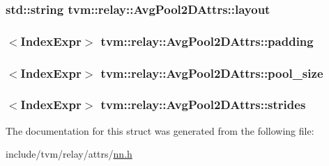 \subsubsection[{\texorpdfstring{layout}{layout}}]{\setlength{\rightskip}{0pt plus 5cm}std\+::string tvm\+::relay\+::\+Avg\+Pool2\+D\+Attrs\+::layout}\hypertarget{structtvm_1_1relay_1_1AvgPool2DAttrs_a73ebaf9cb43a74758479e341050f5ab7}{}\label{structtvm_1_1relay_1_1AvgPool2DAttrs_a73ebaf9cb43a74758479e341050f5ab7}
\subsubsection[{\texorpdfstring{padding}{padding}}]{$<${\bf Index\+Expr}$>$ tvm\+::relay\+::\+Avg\+Pool2\+D\+Attrs\+::padding}\hypertarget{structtvm_1_1relay_1_1AvgPool2DAttrs_a967c1e7c38963db0d388fe217437897e}{}\label{structtvm_1_1relay_1_1AvgPool2DAttrs_a967c1e7c38963db0d388fe217437897e}
\subsubsection[{\texorpdfstring{pool\+\_\+size}{pool_size}}]{$<${\bf Index\+Expr}$>$ tvm\+::relay\+::\+Avg\+Pool2\+D\+Attrs\+::pool\+\_\+size}\hypertarget{structtvm_1_1relay_1_1AvgPool2DAttrs_ac1c60d41763495feac4b838ae3d161fc}{}\label{structtvm_1_1relay_1_1AvgPool2DAttrs_ac1c60d41763495feac4b838ae3d161fc}
\subsubsection[{\texorpdfstring{strides}{strides}}]{$<${\bf Index\+Expr}$>$ tvm\+::relay\+::\+Avg\+Pool2\+D\+Attrs\+::strides}\hypertarget{structtvm_1_1relay_1_1AvgPool2DAttrs_ac005587ae05168fa8e1f2093243ec922}{}\label{structtvm_1_1relay_1_1AvgPool2DAttrs_ac005587ae05168fa8e1f2093243ec922}


The documentation for this struct was generated from the following file\+:\begin{DoxyCompactItemize}
\item 
include/tvm/relay/attrs/\hyperlink{include_2tvm_2relay_2attrs_2nn_8h}{nn.\+h}\end{DoxyCompactItemize}
